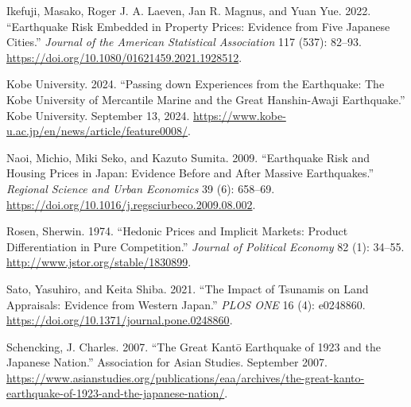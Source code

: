 \documentclass[
  letterpaper,
  DIV=11,
  numbers=noendperiod]{scrartcl}
\newlength{\cslhangindent}
\newenvironment{CSLReferences}[2] %
 {\begin{list}{}{%
  \setlength{\itemindent}{0pt}
  \setlength{\leftmargin}{0pt}
  \setlength{\parsep}{0pt}
  \ifodd #1
   \setlength{\leftmargin}{\cslhangindent}
   \setlength{\itemindent}{-1\cslhangindent}
  \fi
  \setlength{\itemsep}{#2\baselineskip}}}
 {\end{list}}
\begin{document}
\begin{CSLReferences}{1}{0}
Ikefuji, Masako, Roger J. A. Laeven, Jan R. Magnus, and Yuan Yue. 2022.
{``Earthquake Risk Embedded in Property Prices: Evidence from Five
Japanese Cities.''} \emph{Journal of the American Statistical
Association} 117 (537): 82--93.
\url{https://doi.org/10.1080/01621459.2021.1928512}.

Kobe University. 2024. {``Passing down Experiences from the Earthquake:
The Kobe University of Mercantile Marine and the Great Hanshin-Awaji
Earthquake.''} Kobe University. September 13, 2024.
\url{https://www.kobe-u.ac.jp/en/news/article/feature0008/}.

Naoi, Michio, Miki Seko, and Kazuto Sumita. 2009. {``Earthquake Risk and
Housing Prices in {Japan}: {Evidence} Before and After Massive
Earthquakes.''} \emph{Regional Science and Urban Economics} 39 (6):
658--69. \url{https://doi.org/10.1016/j.regsciurbeco.2009.08.002}.

Rosen, Sherwin. 1974. {``Hedonic Prices and Implicit Markets: Product
Differentiation in Pure Competition.''} \emph{Journal of Political
Economy} 82 (1): 34--55. \url{http://www.jstor.org/stable/1830899}.

Sato, Yasuhiro, and Keita Shiba. 2021. {``The Impact of {Tsunamis} on
Land Appraisals: {Evidence} from {Western} {Japan}.''} \emph{PLOS ONE}
16 (4): e0248860. \url{https://doi.org/10.1371/journal.pone.0248860}.

Schencking, J. Charles. 2007. {``The Great Kant{ō} Earthquake of 1923
and the Japanese Nation.''} Association for Asian Studies. September
2007.
\url{https://www.asianstudies.org/publications/eaa/archives/the-great-kanto-earthquake-of-1923-and-the-japanese-nation/}.

\end{CSLReferences}
\end{document}
